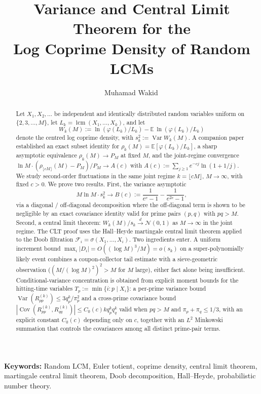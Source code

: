 \documentclass[11pt]{article}
\title{Variance and Central Limit Theorem for the\\[2pt]
Log Coprime Density of Random LCMs}
\author{Muhamad Wakid\,\orcidlink{0009-0008-6274-778X}}
\date{}
\theoremstyle{remark}
\newcommand{\lcm}{\operatorname{lcm}}
\newcommand{\EE}{\mathbb{E}}
\newcommand{\NN}{\mathcal{N}}
\newcommand{\F}{\mathcal{F}}
\DeclareMathOperator{\Var}{Var}
\DeclareMathOperator{\Cov}{Cov}
\begin{document}
\maketitle
\thispagestyle{plain}

\begin{abstract}
Let $X_1, X_2, \ldots$ be independent and identically distributed random variables uniform on $\{2, 3, \ldots, M\}$, let $L_k = \lcm(X_1, \ldots, X_k)$, and let
\[
W_k(M) := \ln(\varphi(L_k)/L_k) - \EE\,\ln(\varphi(L_k)/L_k)
\]
denote the centred log coprime density, with $s_k^2 := \Var W_k(M)$. A companion paper~\cite{wakid1} established an exact subset identity for $\rho_k(M) = \EE[\varphi(L_k)/L_k]$, a sharp asymptotic equivalence $\rho_k(M) \to P_M$ at fixed $M$, and the joint-regime convergence $\ln M \cdot (\rho_{\lfloor cM \rfloor}(M) - P_M)/P_M \to A(c)$ with $A(c) := \sum_{j \geq 1} e^{-cj}\ln(1 + 1/j)$. We study second-order fluctuations in the same joint regime $k = \lfloor cM \rfloor$, $M \to \infty$, with fixed $c > 0$. We prove two results. First, the variance asymptotic
\[
M \ln M \cdot s_k^2 \longrightarrow B(c) := \frac{1}{e^c - 1} - \frac{1}{e^{2c} - 1},
\]
via a diagonal / off-diagonal decomposition where the off-diagonal term is shown to be negligible by an exact covariance identity valid for prime pairs $(p, q)$ with $pq > M$. Second, a central limit theorem: $W_k(M)/s_k \xrightarrow{d} \NN(0, 1)$ as $M \to \infty$ in the joint regime. The CLT proof uses the Hall--Heyde martingale central limit theorem applied to the Doob filtration $\F_i = \sigma(X_1, \ldots, X_i)$. Two ingredients enter. A uniform increment bound $\max_i |D_i| = O((\log M)^3/M) = o(s_k)$ on a super-polynomially likely event combines a coupon-collector tail estimate with a sieve-geometric observation ($(M/(\log M)^2)^2 > M$ for $M$ large), either fact alone being insufficient. Conditional-variance concentration is obtained from explicit moment bounds for the hitting-time variables $T_p := \min\{i : p \mid X_i\}$: a per-prime variance bound $\Var(R_{pp}^{(k)}) \leq 3 q_p^k/\pi_p^2$ and a cross-prime covariance bound $|\Cov(R_{pp}^{(k)}, R_{qq}^{(k)})| \leq C_0(c) k q_p^k q_q^k$ valid when $pq > M$ and $\pi_p + \pi_q \leq 1/3$, with an explicit constant $C_0(c)$ depending only on $c$, together with an $L^2$ Minkowski summation that controls the covariances among all distinct prime-pair terms.
\end{abstract}

\noindent\textbf{Keywords:} Random LCM, Euler totient, coprime density, central limit theorem, martingale central limit theorem, Doob decomposition, Hall--Heyde, probabilistic number theory.
\end{document}
